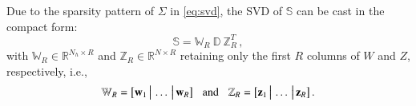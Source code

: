 \documentclass{elsarticle}
\numberwithin{equation}{section}
\theoremstyle{theorem}
\theoremstyle{definition}
\theoremstyle{remark}
\theoremstyle{proposition}
\numberwithin{figure}{section}
\newcommand{\bg}[1]{\boldsymbol{#1}}
\begin{document}
		\noindent Due to the sparsity pattern of $\Sigma$ in \eqref{eq:svd}, the SVD of $\mathbb{S}$ can be cast in the compact form:
		\begin{equation*}
			\label{eq:svd-compact}
			\mathbb{S} = \mathbb{W}_R^{} ~ \mathbb{D} ~ \mathbb{Z}_R^T \, ,
		\end{equation*}
		with $\mathbb{W}_R \in \mathbb{R}^{{N_h} \times R}$ and $\mathbb{Z}_R \in \mathbb{R}^{N \times R}$ retaining only the first $R$ columns of $W$ and $Z$, respectively, i.e.,
		\begin{equation*}
			\label{eq:svd-compact-matrices}
			\mathbb{W}_R = \big[ \mathbf{w}_1 \, \big| \, \ldots \, \big| \, \mathbf{w}_R \big] \hspace*{0.3cm} \text{and} \hspace*{0.3cm} \mathbb{Z}_R = \big[ \mathbf{z}_1 \, \big| \, \ldots \, \big| \, \mathbf{z}_R \big] \, .
		\end{equation*}
		
\end{document}
